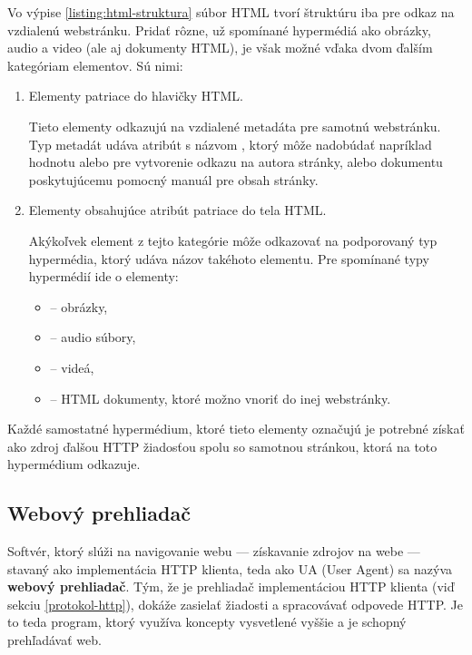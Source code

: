 Vo výpise \ref{listing:html-struktura} súbor HTML tvorí štruktúru iba pre odkaz na vzdialenú webstránku.
Pridať rôzne, už spomínané hypermédiá ako obrázky, audio a video (ale aj dokumenty HTML), je však možné vďaka dvom ďalším kategóriam elementov. 
Sú nimi: 
\begin{enumerate}
    \item Elementy  patriace do hlavičky HTML.

    Tieto elementy odkazujú na vzdialené metadáta pre samotnú webstránku.
    Typ metadát udáva atribút s názvom , ktorý môže nadobúdať napríklad hodnotu 
     alebo  pre vytvorenie odkazu na autora stránky, alebo dokumentu poskytujúcemu 
    pomocný manuál pre obsah stránky.
    
    \item Elementy obsahujúce atribút  patriace do tela HTML.

    Akýkoľvek element z tejto kategórie môže odkazovať na podporovaný typ hypermédia, ktorý udáva názov takéhoto elementu.
    Pre spomínané typy hypermédií ide o elementy: 
    \begin{itemize}
        \item {} -- obrázky,
        \item {} -- audio súbory,
        \item {} -- videá,
        \item {} -- HTML dokumenty, ktoré možno vnoriť do inej webstránky.
    \end{itemize}
    
\end{enumerate}

Každé samostatné hypermédium, ktoré tieto elementy označujú je potrebné získať ako zdroj ďalšou HTTP žiadosťou spolu so samotnou stránkou, ktorá na toto hypermédium odkazuje.

\subsection{Webový prehliadač}
\label{webovy-prehliadac}


Softvér, ktorý slúži na navigovanie webu --- získavanie zdrojov na webe --- stavaný ako implementácia HTTP klienta, teda ako UA (User Agent) sa nazýva \textbf{webový prehliadač}. 
Tým, že je prehliadač implementáciou HTTP klienta (viď sekciu \ref{protokol-http}), dokáže zasielať žiadosti a spracovávať odpovede HTTP.
Je to teda program, ktorý využíva koncepty vysvetlené vyššie a je schopný prehľadávať web.

